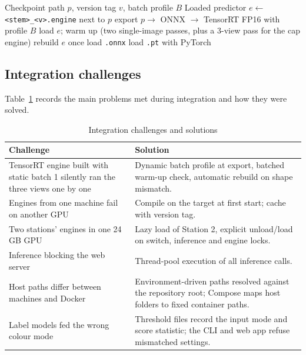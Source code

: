 \begin{algorithm}[htbp]
\caption{Engine load with versioned cache and fallback}
\label{alg:engine}
\begin{algorithmic}[1]
\Require Checkpoint path $p$, version tag $v$, batch profile $B$
\Ensure Loaded predictor
    \State $e \gets$ \texttt{<stem>\_<v>.engine} next to $p$
        \State export $p \rightarrow$ ONNX $\rightarrow$ TensorRT FP16 with profile $B$ 
    \EndIf
    \State load $e$; warm up (two single-image passes, plus a 3-view pass for the cap engine)
     \State rebuild $e$ once \EndIf
{} \State load \texttt{.onnx}
\Else \State load \texttt{.pt} with PyTorch
\EndIf
\end{algorithmic}
\end{algorithm}

\subsection{Integration challenges}
Table~\ref{tab:challenges} records the main problems met during integration and how they were solved.

\begin{table}[htbp]
\centering
\caption{Integration challenges and solutions}
\label{tab:challenges}
\footnotesize
\begin{tabularx}{\textwidth}{|p{4.6cm}|X|}
\hline
\textbf{Challenge} & \textbf{Solution} \\ \hline
TensorRT engine built with static batch 1 silently ran the three views one by one & Dynamic batch profile at export, batched warm-up check, automatic rebuild on shape mismatch. \\ \hline
Engines from one machine fail on another GPU & Compile on the target at first start; cache with version tag. \\ \hline
Two stations' engines in one 24\,GB GPU & Lazy load of Station 2, explicit unload/load on switch, inference and engine locks. \\ \hline
Inference blocking the web server & Thread-pool execution of all inference calls. \\ \hline
Host paths differ between machines and Docker & Environment-driven paths resolved against the repository root; Compose maps host folders to fixed container paths. \\ \hline
Label models fed the wrong colour mode & Threshold files record the input mode and score statistic; the CLI and web app refuse mismatched settings. \\ \hline
\end{tabularx}
\end{table}

